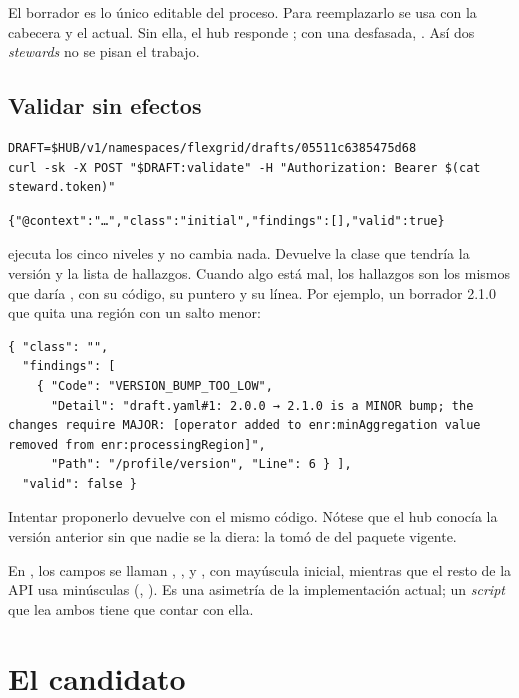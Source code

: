 El borrador es lo único editable del proceso. Para reemplazarlo se usa  con la cabecera 
y el  actual. Sin ella, el hub responde ; con una desfasada, . Así dos
\emph{stewards} no se pisan el trabajo.

\subsection{Validar sin efectos}

\begin{lstlisting}[style=sh]
DRAFT=$HUB/v1/namespaces/flexgrid/drafts/05511c6385475d68
curl -sk -X POST "$DRAFT:validate" -H "Authorization: Bearer $(cat steward.token)"
\end{lstlisting}
\begin{lstlisting}[style=out]
{"@context":"…","class":"initial","findings":[],"valid":true}
\end{lstlisting}

 ejecuta los cinco niveles y no cambia nada. Devuelve la clase que tendría la versión y la lista
de hallazgos. Cuando algo está mal, los hallazgos son los mismos que daría , con su código, su
puntero y su línea. Por ejemplo, un borrador 2.1.0 que quita una región con un salto menor:

\begin{lstlisting}[style=out]
{ "class": "",
  "findings": [
    { "Code": "VERSION_BUMP_TOO_LOW",
      "Detail": "draft.yaml#1: 2.0.0 → 2.1.0 is a MINOR bump; the changes require MAJOR: [operator added to enr:minAggregation value removed from enr:processingRegion]",
      "Path": "/profile/version", "Line": 6 } ],
  "valid": false }
\end{lstlisting}

Intentar proponerlo devuelve  con el mismo código. Nótese que el hub conocía la versión anterior sin
que nadie se la diera: la tomó de  del paquete vigente.

\begin{notaPractica}
En , los campos se llaman , ,  y , con mayúscula
inicial, mientras que el resto de la API usa minúsculas (, ). Es una asimetría de la
implementación actual; un \emph{script} que lea ambos tiene que contar con ella.
\end{notaPractica}

\section{El candidato}

